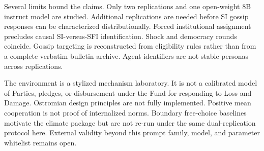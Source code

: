 Several limits bound the claims.
Only two replications and one open-weight 8B instruct model are studied.
Additional replications are needed before SI gossip responses can be characterized distributionally.
Forced institutional assignment precludes causal SI-versus-SFI identification.
Shock and democracy rounds coincide.
Gossip targeting is reconstructed from eligibility rules rather than from a complete verbatim bulletin archive.
Agent identifiers are not stable personas across replications.

The environment is a stylized mechanism laboratory.
It is not a calibrated model of Parties, pledges, or disbursement under the Fund for responding to Loss and Damage.
Ostromian design principles are not fully implemented.
Positive mean cooperation is not proof of internalized norms.
Boundary free-choice baselines motivate the climate package but are not re-run under the same dual-replication protocol here.
External validity beyond this prompt family, model, and parameter whitelist remains open.
